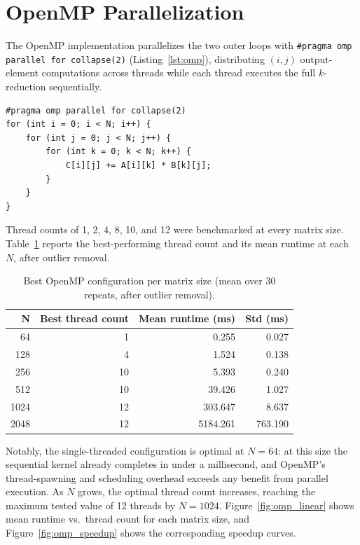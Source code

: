 \documentclass[11pt]{article}
\begin{document}
\section{OpenMP Parallelization}
\label{sec:openmp}

The OpenMP implementation parallelizes the two outer loops with \texttt{\#pragma omp parallel for collapse(2)} (Listing~\ref{lst:omp}), distributing $(i,j)$ output-element computations across threads while each thread executes the full $k$-reduction sequentially.

\begin{lstlisting}[caption={OpenMP-parallelized matrix multiplication kernel.}, label={lst:omp}]
#pragma omp parallel for collapse(2)
for (int i = 0; i < N; i++) {
    for (int j = 0; j < N; j++) {
        for (int k = 0; k < N; k++) {
            C[i][j] += A[i][k] * B[k][j];
        }
    }
}
\end{lstlisting}

Thread counts of 1, 2, 4, 8, 10, and 12 were benchmarked at every matrix size. Table~\ref{tab:omp_best} reports the best-performing thread count and its mean runtime at each $N$, after outlier removal.



\begin{table}[h]
\centering
\caption{Best OpenMP configuration per matrix size (mean over 30 repeats, after outlier removal).}
\label{tab:omp_best}
\begin{tabular}{rrrr}
\toprule
\textbf{N} & \textbf{Best thread count} & \textbf{Mean runtime (ms)} & \textbf{Std (ms)} \\
\midrule
64   & 1  & 0.255    & 0.027 \\
128  & 4  & 1.524    & 0.138 \\
256  & 10 & 5.393    & 0.240 \\
512  & 10 & 39.426   & 1.027 \\
1024 & 12 & 303.647  & 8.637 \\
2048 & 12 & 5184.261 & 763.190 \\
\bottomrule
\end{tabular}
\end{table}

Notably, the single-threaded configuration is optimal at $N=64$: at this size the sequential kernel already completes in under a millisecond, and OpenMP's thread-spawning and scheduling overhead exceeds any benefit from parallel execution. As $N$ grows, the optimal thread count increases, reaching the maximum tested value of 12 threads by $N=1024$. Figure~\ref{fig:omp_linear} shows mean runtime vs.\ thread count for each matrix size, and Figure~\ref{fig:omp_speedup} shows the corresponding speedup curves.
\end{document}
